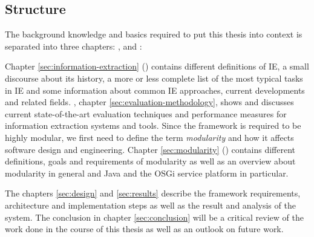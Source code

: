 \subsection{Structure}
The background knowledge and basics required to put this thesis into context is separated into three chapters: ,  and :

Chapter \ref{sec:information-extraction} () contains different definitions of \gls{IE}, a small discourse about its history, a more or less complete list of the most typical tasks in \gls{IE} and some information about common \gls{IE} approaches, current developments and related fields. , chapter \ref{sec:evaluation-methodology}, shows and discusses current state-of-the-art evaluation techniques and performance measures for information extraction systems and tools. Since the framework is required to be highly modular, we first need to define the term \textit{modularity} and how it affects software design and engineering. Chapter \ref{sec:modularity} () contains different definitions, goals and requirements of modularity as well as an overview about modularity in general and Java and the \gls{OSGi} service platform in particular.

The chapters \ref{sec:design}  and \ref{sec:results}  describe the framework requirements, architecture and implementation steps as well as the result and analysis of the system. The conclusion in chapter \ref{sec:conclusion} will be a critical review of the work done in the course of this thesis as well as an outlook on future work.